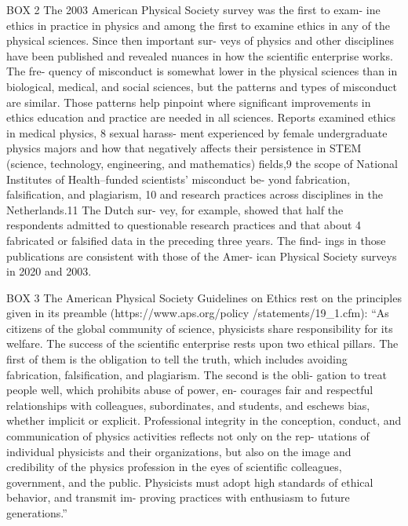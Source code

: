 BOX 2
The 2003 American Physical Society survey was the first to exam-
ine ethics in practice in physics and among the first to examine
ethics in any of the physical sciences. Since then important sur-
veys of physics and other disciplines have been published and
revealed nuances in how the scientific enterprise works. The fre-
quency of misconduct is somewhat lower in the physical sciences
than in biological, medical, and social sciences, but the patterns
and types of misconduct are similar. Those patterns help pinpoint
where significant improvements in ethics education and practice
are needed in all sciences.
Reports examined ethics in medical physics, 8 sexual harass-
ment experienced by female undergraduate physics majors and
how that negatively affects their persistence in STEM (science,
technology, engineering, and mathematics) fields,9 the scope of
National Institutes of Health–funded scientists’ misconduct be-
yond fabrication, falsification, and plagiarism, 10 and research
practices across disciplines in the Netherlands.11 The Dutch sur-
vey, for example, showed that half the respondents admitted to
questionable research practices and that about 4%
fabricated or falsified data in the preceding three years. The find-
ings in those publications are consistent with those of the Amer-
ican Physical Society surveys in 2020 and 2003.

BOX 3
The American Physical Society Guidelines on Ethics rest on the
principles given in its preamble (https://www.aps.org/policy
/statements/19_1.cfm): “As citizens of the global community of
science, physicists share responsibility for its welfare. The success
of the scientific enterprise rests upon two ethical pillars. The first
of them is the obligation to tell the truth, which includes avoiding
fabrication, falsification, and plagiarism. The second is the obli-
gation to treat people well, which prohibits abuse of power, en-
courages fair and respectful relationships with colleagues,
subordinates, and students, and eschews bias, whether implicit or
explicit. Professional integrity in the conception, conduct, and
communication of physics activities reflects not only on the rep-
utations of individual physicists and their organizations, but also
on the image and credibility of the physics profession in the eyes
of scientific colleagues, government, and the public. Physicists
must adopt high standards of ethical behavior, and transmit im-
proving practices with enthusiasm to future generations.”


